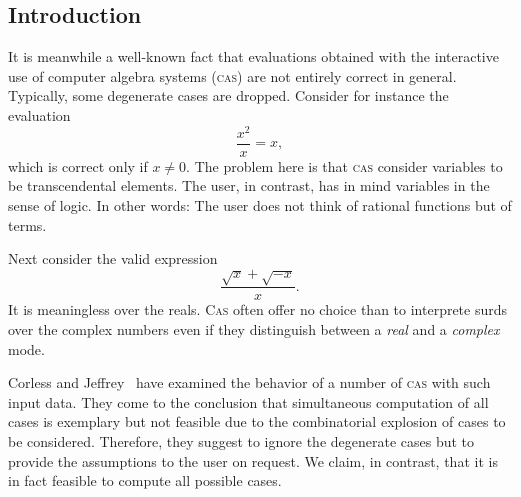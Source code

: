 

\subsection{Introduction}
\ifdefined{}\else
\newenvironment{gex}{\left[\begin{array}{c|c}}{\end{array}\right]}
\newcommand{\gc}[1]{\mbox{\boldmath$#1$}}
\newcommand{\true}{\textrm{T}}
\newcommand{\false}{\textrm{F}}
\newcommand{\E}{\textrm{E}}
\newcommand{\GE}{\textrm{GE}}
\newcommand{\gscheme}{\textrm{gscheme}}
\newcommand{\sign}{\textrm{sign}}
\fi
It is meanwhile a well-known fact that evaluations obtained with the
interactive use of computer algebra systems (\textsc{cas}) are not
entirely correct in general. Typically, some degenerate cases are
dropped. Consider for instance the evaluation
\[
\frac{x^2}{x}=x,
\]
which is correct only if $x\neq0$.
The problem here is that \textsc{cas} consider variables to be
transcendental elements. The user, in contrast, has in mind variables
in the sense of logic. In other words: The user does not think of
rational functions but of terms.

Next consider the valid expression
\[
\frac{\sqrt{x}+\sqrt{-x}}{x}.
\]
It is meaningless over the reals. \textsc{Cas} often offer no choice than
to interprete surds over the complex numbers even if they distinguish
between a {\em real} and a {\em complex} mode.

Corless and Jeffrey~\cite{CorlessJeffrey:92} have examined the
behavior of a number of \textsc{cas} with such input data. They come to
the conclusion that simultaneous computation of all cases is exemplary
but not feasible due to the combinatorial explosion of cases to be
considered. Therefore, they suggest to ignore the degenerate cases but
to provide the assumptions to the user on request. We claim, in
contrast, that it is in fact feasible to compute all possible cases.

